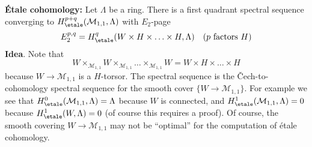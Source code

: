 \medskip\noindent
{\bf \'Etale cohomology:} Let $\Lambda$ be a ring.
There is a first quadrant spectral sequence
converging to $H^{p + q}_\etale(\mathcal{M}_{1, 1}, \Lambda)$
with $E_2$-page
$$
E_2^{p, q} = H_\etale^q(W \times H \times \ldots \times H, \Lambda)
\quad(p\text{ factors }H)
$$
\noindent
{\bf Idea}. Note that
$$
W \times_{\mathcal{M}_{1, 1}} W \times_{\mathcal{M}_{1, 1}}
\ldots \times_{\mathcal{M}_{1, 1}} W
= W \times H \times \ldots \times H
$$
because $W \to \mathcal{M}_{1, 1}$ is a $H$-torsor. The spectral
sequence is the {\v C}ech-to-cohomology spectral sequence for
the smooth cover $\{W \to \mathcal{M}_{1, 1}\}$. For example we see that
$H^0_\etale(\mathcal{M}_{1, 1}, \Lambda) = \Lambda$ because
$W$ is connected, and $H^1_\etale(\mathcal{M}_{1, 1}, \Lambda) = 0$
because $H^1_\etale(W, \Lambda) = 0$ (of course this requires
a proof). Of course, the smooth covering $W \to \mathcal{M}_{1, 1}$ may
not be ``optimal'' for the computation of \'etale cohomology.




















